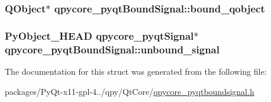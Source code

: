 \subsubsection[{bound\+\_\+qobject}]{\setlength{\rightskip}{0pt plus 5cm}Q\+Object$\ast$ qpycore\+\_\+pyqt\+Bound\+Signal\+::bound\+\_\+qobject}\label{structqpycore__pyqtBoundSignal_a2ca5dffd4767281ad913274f3c3714fe}
\hypertarget{structqpycore__pyqtBoundSignal_afd50b3d18fc8f9c39d524527a9a663c8}{}
\subsubsection[{unbound\+\_\+signal}]{\setlength{\rightskip}{0pt plus 5cm}Py\+Object\+\_\+\+H\+E\+A\+D {\bf qpycore\+\_\+pyqt\+Signal}$\ast$ qpycore\+\_\+pyqt\+Bound\+Signal\+::unbound\+\_\+signal}\label{structqpycore__pyqtBoundSignal_afd50b3d18fc8f9c39d524527a9a663c8}


The documentation for this struct was generated from the following file\+:\begin{DoxyCompactItemize}
\item 
packages/\+Py\+Qt-\/x11-\/gpl-\/4../qpy/\+Qt\+Core/\hyperlink{qpycore__pyqtboundsignal_8h}{qpycore\+\_\+pyqtboundsignal.\+h}\end{DoxyCompactItemize}
